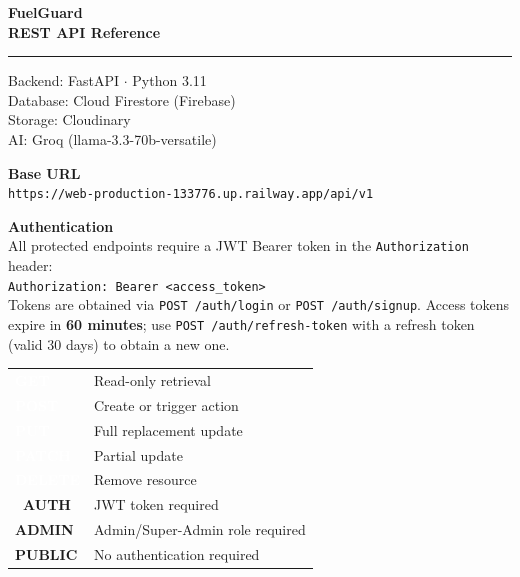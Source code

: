 \documentclass[12pt,a4paper]{article}
\newcommand{\methodbadge}[2]{%
  {\setlength{\fboxsep}{3pt}\colorbox{#1}{\textcolor{white}{\bfseries\small\sffamily#2}}}%
}
\newcommand{\GET}{\methodbadge{getblue}{GET}}
\newcommand{\POST}{\methodbadge{postgreen}{POST}}
\newcommand{\PUT}{\methodbadge{putorange}{PUT}}
\newcommand{\DELETE}{\methodbadge{deletered}{DELETE}}
\newcommand{\PATCH}{\methodbadge{patchpurple}{PATCH}}
\newcommand{\authrequired}{%
  {\setlength{\fboxsep}{2pt}\colorbox{tagbg}{\textcolor{tagfg}{\tiny\bfseries\sffamily\faLock~AUTH}}}%
}
\newcommand{\adminonly}{%
  {\setlength{\fboxsep}{2pt}\colorbox{reqbg}{\textcolor{putorange}{\tiny\bfseries\sffamily ADMIN}}}%
}
\newcommand{\noauth}{%
  {\setlength{\fboxsep}{2pt}\colorbox{resbg}{\textcolor{postgreen}{\tiny\bfseries\sffamily PUBLIC}}}%
}
\begin{document}

\begin{titlepage}
  \centering
  \vspace*{2cm}
  {\Huge\bfseries\color{navydark} FuelGuard\\[6pt]
   \huge REST API Reference\par}
  \vspace{0.5cm}
  \textcolor{bordergray}{\rule{10cm}{0.4pt}}
  \vspace{0.5cm}

  {\large\color{textgray}
    Backend: FastAPI $\cdot$ Python 3.11\\
    Database: Cloud Firestore (Firebase)\\
    Storage: Cloudinary\\
    AI: Groq (llama-3.3-70b-versatile)
  }

  \vspace{1.5cm}
  \begin{tcolorbox}[
    colback=bglight, colframe=bordergray, arc=6pt,
    width=10cm, halign=center
  ]
    \textbf{Base URL}\\[4pt]
    \texttt{\small https://web-production-133776.up.railway.app/api/v1}
  \end{tcolorbox}

  \vspace{1.5cm}
  \begin{tcolorbox}[colback=tagbg, colframe=tagfg, arc=6pt, width=12cm]
    \textbf{\color{tagfg}Authentication}\\[4pt]
    \small All protected endpoints require a JWT Bearer token in the
    \texttt{Authorization} header:\\[4pt]
    \texttt{Authorization: Bearer \textless access\_token\textgreater}\\[4pt]
    Tokens are obtained via \texttt{POST /auth/login} or \texttt{POST /auth/signup}.
    Access tokens expire in \textbf{60 minutes}; use \texttt{POST /auth/refresh-token}
    with a refresh token (valid 30 days) to obtain a new one.
  \end{tcolorbox}

  \vspace{1.5cm}
  \begin{tabular}{ll}
    \GET    & Read-only retrieval \\[4pt]
    \POST   & Create or trigger action \\[4pt]
    \PUT    & Full replacement update \\[4pt]
    \PATCH  & Partial update \\[4pt]
    \DELETE & Remove resource \\[8pt]
    \authrequired & JWT token required \\[4pt]
    \adminonly    & Admin/Super-Admin role required \\[4pt]
    \noauth       & No authentication required \\
  \end{tabular}


\end{titlepage}
\end{document}
